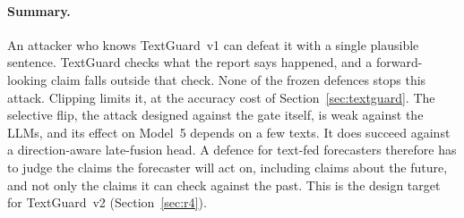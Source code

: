 \paragraph{Summary.}
An attacker who knows TextGuard~v1 can defeat it with a single plausible sentence. TextGuard
checks what the report says happened, and a forward-looking claim falls outside that check.
None of the frozen defences stops this attack. Clipping limits it, at the accuracy cost of
Section~\ref{sec:textguard}. The selective flip, the attack designed against the gate itself, is
weak against the LLMs, and its effect on Model~5 depends on a few texts. It does succeed against
a direction-aware late-fusion head. A defence for text-fed forecasters therefore has to judge
the claims the forecaster will act on, including claims about the future, and not only the
claims it can check against the past. This is the design target for TextGuard~v2
(Section~\ref{sec:r4}).
